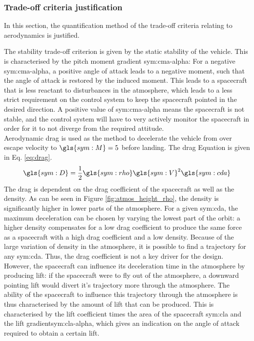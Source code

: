 \subsubsection{Trade-off criteria justification}
In this section, the quantification method of the trade-off criteria relating to aerodynamics is justified.

The stability trade-off criterion is given by the static stability of the vehicle. This is characterised by the pitch moment gradient \gls{sym:cma-alpha}: For a negative \gls{sym:cma-alpha}, a positive angle of attack leads to a negative moment, such that the angle of attack is restored by the induced moment. This leads to a spacecraft that is less reactant to disturbances in the atmosphere, which leads to a less strict requirement on the control system to keep the spacecraft pointed in the desired direction. A positive value of \gls{sym:cma-alpha} means the spacecraft is not stable, and the control system will have to very actively monitor the spacecraft in order for it to not diverge from the required attitude. \\

Aerodynamic drag is used as the method to decelerate the vehicle from over escape velocity to $\gls{sym:M}=5$ before landing. The drag Equation is given in Eq. \ref{eq:drag}.
\begin{equation} \label{eq:drag}
\gls{sym:D} = \frac{1}{2}\gls{sym:rho}\gls{sym:V}^2\gls{sym:cda}
\end{equation}
The drag is dependent on the drag coefficient of the spacecraft as well as the density. As can be seen in Figure \ref{fig:atmos_height_rho}, the density is significantly higher in lower parts of the atmosphere. For a given \gls{sym:cda}, the maximum deceleration can be chosen by varying the lowest part of the orbit: a higher density compensates for a low drag coefficient to produce the same force as a spacecraft with a high drag coefficient and a low density. Because of the large variation of density in the atmosphere, it is possible to find a trajectory for any \gls{sym:cda}. Thus, the drag coefficient is not a key driver for the design. However, the spacecraft can influence its deceleration time in the atmosphere by producing lift: if the spacecraft were to fly out of the atmosphere, a downward pointing lift would divert it's trajectory more through the atmosphere. The ability of the spacecraft to influence this trajectory through the atmosphere is thus characterised by the amount of lift that can be produced. This is characterised by the lift coefficient times the area of the spacecraft \gls{sym:cla} and the lift gradient\gls{sym:cla-alpha}, which gives an indication on the angle of attack required to obtain a certain lift. \\


